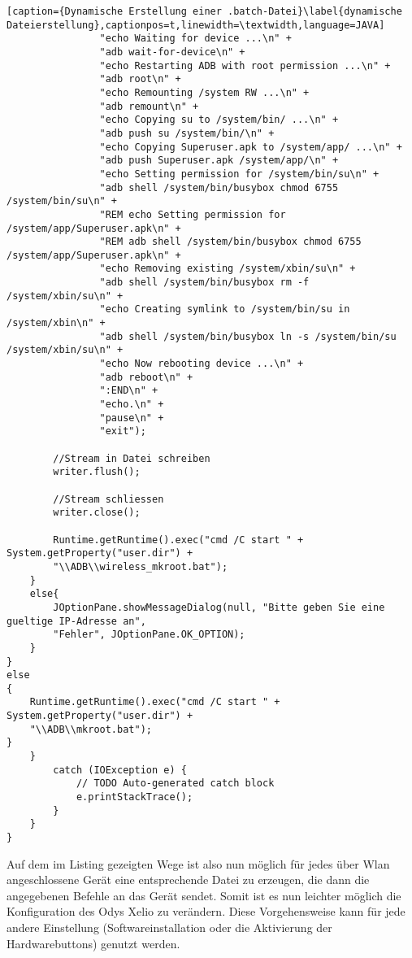 \begin{flushleft}
\begin{lstlisting}[caption={Dynamische Erstellung einer .batch-Datei}\label{dynamische Dateierstellung},captionpos=t,linewidth=\textwidth,language=JAVA]
				"echo Waiting for device ...\n" +
				"adb wait-for-device\n" +
				"echo Restarting ADB with root permission ...\n" +
				"adb root\n" +
				"echo Remounting /system RW ...\n" +
				"adb remount\n" +
				"echo Copying su to /system/bin/ ...\n" +
				"adb push su /system/bin/\n" +
				"echo Copying Superuser.apk to /system/app/ ...\n" +
				"adb push Superuser.apk /system/app/\n" +
				"echo Setting permission for /system/bin/su\n" +
				"adb shell /system/bin/busybox chmod 6755 /system/bin/su\n" +
				"REM echo Setting permission for /system/app/Superuser.apk\n" +
				"REM adb shell /system/bin/busybox chmod 6755 /system/app/Superuser.apk\n" +
				"echo Removing existing /system/xbin/su\n" +
				"adb shell /system/bin/busybox rm -f /system/xbin/su\n" +
				"echo Creating symlink to /system/bin/su in /system/xbin\n" +
				"adb shell /system/bin/busybox ln -s /system/bin/su /system/xbin/su\n" +
				"echo Now rebooting device ...\n" +
				"adb reboot\n" +
				":END\n" +
				"echo.\n" +
				"pause\n" +
				"exit");
				
		//Stream in Datei schreiben
		writer.flush();
								
		//Stream schliessen
		writer.close();
								
		Runtime.getRuntime().exec("cmd /C start " + System.getProperty("user.dir") + 
		"\\ADB\\wireless_mkroot.bat");
	}
	else{
		JOptionPane.showMessageDialog(null, "Bitte geben Sie eine gueltige IP-Adresse an", 
		"Fehler", JOptionPane.OK_OPTION);
	}
}
else
{
	Runtime.getRuntime().exec("cmd /C start " + System.getProperty("user.dir") + 
	"\\ADB\\mkroot.bat"); 
}	
	}
		catch (IOException e) {
			// TODO Auto-generated catch block
			e.printStackTrace();
		}
	}
}
\end{lstlisting}

Auf dem im Listing gezeigten Wege ist also nun möglich für jedes über Wlan angeschlossene Gerät eine entsprechende Datei zu erzeugen, die dann die angegebenen Befehle an das Gerät sendet. Somit ist es nun leichter möglich die Konfiguration des Odys Xelio zu verändern. Diese Vorgehensweise kann für jede andere Einstellung (Softwareinstallation oder die Aktivierung der Hardwarebuttons) genutzt werden. 


\end{flushleft}
